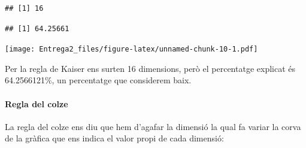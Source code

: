 \documentclass[
]{article}
\newenvironment{Shaded}{\begin{snugshade}}{\end{snugshade}}
\newcommand{\AttributeTok}[1]{\textcolor[rgb]{0.77,0.63,0.00}{#1}}
\newcommand{\DecValTok}[1]{\textcolor[rgb]{0.00,0.00,0.81}{#1}}
\newcommand{\FloatTok}[1]{\textcolor[rgb]{0.00,0.00,0.81}{#1}}
\newcommand{\FunctionTok}[1]{\textcolor[rgb]{0.00,0.00,0.00}{#1}}
\newcommand{\NormalTok}[1]{#1}
\newcommand{\SpecialCharTok}[1]{\textcolor[rgb]{0.00,0.00,0.00}{#1}}
\newcommand{\StringTok}[1]{\textcolor[rgb]{0.31,0.60,0.02}{#1}}
\begin{document}
\begin{verbatim}
## [1] 16
\end{verbatim}

\begin{Shaded}
\end{Shaded}

\begin{verbatim}
## [1] 64.25661
\end{verbatim}

\begin{Shaded}
\end{Shaded}

\texttt{[image: Entrega2\_files/figure-latex/unnamed-chunk-10-1.pdf]}

Per la regla de Kaiser ens surten 16 dimensions, però el percentatge
explicat és 64.2566121\%, un percentatge que considerem baix.

\hypertarget{regla-del-colze}{%
\paragraph{Regla del colze}\label{regla-del-colze}}

La regla del colze ens diu que hem d'agafar la dimensió la qual fa
variar la corva de la gràfica que ens indica el valor propi de cada
dimensió:

\begin{Shaded}
\end{Shaded}
\end{document}
